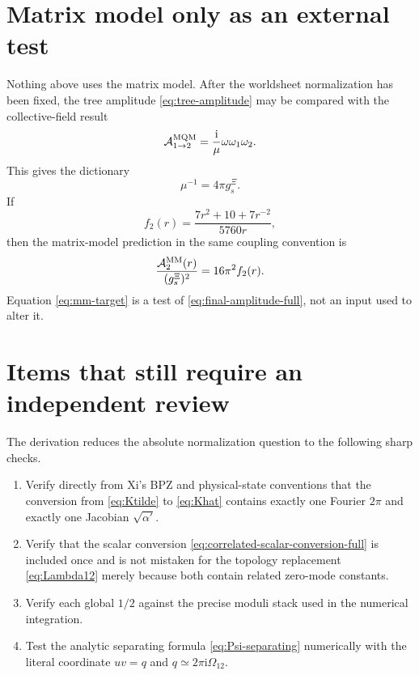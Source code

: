 \documentclass[11pt]{article}
\numberwithin{equation}{section}
\newcommand{\A}{\alpha'}
\newcommand{\ii}{\mathrm i}
\newcommand{\cA}{\mathcal A}
\begin{document}
\section{Matrix model only as an external test}

Nothing above uses the matrix model.  After the worldsheet normalization has
been fixed, the tree amplitude \eqref{eq:tree-amplitude} may be compared with
the collective-field result
\begin{equation}
 \cA_{1\to2}^{\rm MQM}
 =\frac{\ii}{\mu}\omega\omega_1\omega_2.
\end{equation}
This gives the dictionary
\begin{equation}
 \boxed{\mu^{-1}=4\pi g_s^{\Xi}.}
 \label{eq:mu-gs}
\end{equation}
If
\begin{equation}
 f_2(r)=\frac{7r^2+10+7r^{-2}}{5760r},
\end{equation}
then the matrix-model prediction in the same coupling convention is
\begin{equation}
 \frac{\cA_2^{\rm MM}(r)}{(g_s^\Xi)^2}
 =16\pi^2 f_2(r).
 \label{eq:mm-target}
\end{equation}
Equation \eqref{eq:mm-target} is a test of \eqref{eq:final-amplitude-full}, not an
input used to alter it.

\section{Items that still require an independent review}

The derivation reduces the absolute normalization question to the following
sharp checks.
\begin{enumerate}
\item Verify directly from Xi's BPZ and physical-state conventions that the
conversion from \eqref{eq:Ktilde} to \eqref{eq:Khat} contains exactly one
Fourier $2\pi$ and exactly one Jacobian $\sqrt{\A}$.
\item Verify that the scalar conversion \eqref{eq:correlated-scalar-conversion-full}
is included once and is not mistaken for the topology replacement
\eqref{eq:Lambda12} merely because both contain related zero-mode constants.
\item Verify each global $1/2$ against the precise moduli stack used in the
numerical integration.
\item Test the analytic separating formula \eqref{eq:Psi-separating}
numerically with the literal coordinate $uv=q$ and
$q\simeq2\pi\ii\Omega_{12}$.
\end{enumerate}
\end{document}
